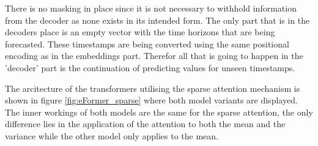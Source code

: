 \documentclass{article}
\begin{document}
There is no masking in place since it is not necessary to withhold information from the decoder as none exists in its intended form. The only part that is in the decoders place is an empty vector with the time horizons that are being forecasted. These timestamps are being converted using the same positional encoding as in the embeddings part. Therefor all that is going to happen in the 'decoder' part is the continuation of predicting values for unseen timestamps.

The arcitecture of the transformers utilising the sparse attention mechanism is shown in figure \ref{fig:eFormer_sparse} where both model variants are displayed. The inner workings of both models are the same for the sparse attention, the only difference lies in the application of the attention to both the mean and the variance while the other model only applies to the mean.
\end{document}
